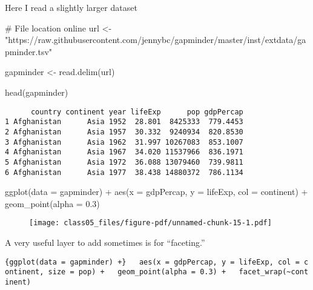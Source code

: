 \documentclass[
  letterpaper,
  DIV=11,
  numbers=noendperiod]{scrartcl}
\newenvironment{Shaded}{\begin{snugshade}}{\end{snugshade}}
\newcommand{\AttributeTok}[1]{\textcolor[rgb]{0.40,0.45,0.13}{#1}}
\newcommand{\CommentTok}[1]{\textcolor[rgb]{0.37,0.37,0.37}{#1}}
\newcommand{\FloatTok}[1]{\textcolor[rgb]{0.68,0.00,0.00}{#1}}
\newcommand{\FunctionTok}[1]{\textcolor[rgb]{0.28,0.35,0.67}{#1}}
\newcommand{\NormalTok}[1]{\textcolor[rgb]{0.00,0.23,0.31}{#1}}
\newcommand{\OtherTok}[1]{\textcolor[rgb]{0.00,0.23,0.31}{#1}}
\newcommand{\SpecialCharTok}[1]{\textcolor[rgb]{0.37,0.37,0.37}{#1}}
\newcommand{\StringTok}[1]{\textcolor[rgb]{0.13,0.47,0.30}{#1}}
\begin{document}
Here I read a slightly larger dataset

\begin{Shaded}
\begin{Highlighting}[]
\CommentTok{\# File location online}
\NormalTok{url }\OtherTok{\textless{}{-}} \StringTok{"https://raw.githubusercontent.com/jennybc/gapminder/master/inst/extdata/gapminder.tsv"}

\NormalTok{gapminder }\OtherTok{\textless{}{-}} \FunctionTok{read.delim}\NormalTok{(url)}

\FunctionTok{head}\NormalTok{(gapminder)}
\end{Highlighting}
\end{Shaded}

\begin{verbatim}
      country continent year lifeExp      pop gdpPercap
1 Afghanistan      Asia 1952  28.801  8425333  779.4453
2 Afghanistan      Asia 1957  30.332  9240934  820.8530
3 Afghanistan      Asia 1962  31.997 10267083  853.1007
4 Afghanistan      Asia 1967  34.020 11537966  836.1971
5 Afghanistan      Asia 1972  36.088 13079460  739.9811
6 Afghanistan      Asia 1977  38.438 14880372  786.1134
\end{verbatim}

\begin{Shaded}
\begin{Highlighting}[]
\FunctionTok{ggplot}\NormalTok{(}\AttributeTok{data =}\NormalTok{ gapminder) }\SpecialCharTok{+}
  \FunctionTok{aes}\NormalTok{(}\AttributeTok{x =}\NormalTok{ gdpPercap, }\AttributeTok{y =}\NormalTok{ lifeExp, }\AttributeTok{col =}\NormalTok{ continent) }\SpecialCharTok{+}
  \FunctionTok{geom\_point}\NormalTok{(}\AttributeTok{alpha =} \FloatTok{0.3}\NormalTok{)}
\end{Highlighting}
\end{Shaded}

\begin{figure}[H]

{\centering \texttt{[image: class05\_files/figure-pdf/unnamed-chunk-15-1.pdf]}

}

\end{figure}

A very useful layer to add sometimes is for ``faceting.''

\texttt{\{ggplot(data\ =\ gapminder)\ +\}\ \ \ aes(x\ =\ gdpPercap,\ y\ =\ lifeExp,\ col\ =\ continent,\ size\ =\ pop)\ +\ \ \ geom\_point(alpha\ =\ 0.3)\ +\ \ \ facet\_wrap(\textasciitilde{}continent)}
\end{document}
